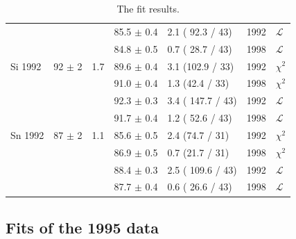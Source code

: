 \begin{table}[h]
\begin{center}
\begin{tabular}{|l||l|l|l|l|l|l|}
                 &                &     & 85.5 $\pm$ 0.4 & 2.1 ( 92.3 / 43) & 1992 & $\mathcal{L}$ \\
                 &                &     & 84.8 $\pm$ 0.5 & 0.7 ( 28.7 / 43) & 1998 & $\mathcal{L}$ \\
      \hline                                                                 
       Si 1992   & 92   $\pm$ 2   & 1.7 & 89.6 $\pm$ 0.4 &  3.1 (102.9 / 33)& 1992 & $\chi^2$ \\  
                 &                &     & 91.0 $\pm$ 0.4 &  1.3 (42.4 / 33) & 1998 & $\chi^2$ \\  
                                                                             
                 &                &     & 92.3 $\pm$ 0.3 & 3.4 ( 147.7 / 43)& 1992 & $\mathcal{L}$ \\
                 &                &     & 91.7 $\pm$ 0.4 & 1.2 ( 52.6 / 43) & 1998 & $\mathcal{L}$ \\
      \hline                                                                 
       Sn 1992   & 87   $\pm$ 2   & 1.1 & 85.6 $\pm$ 0.5 &  2.4 (74.7 / 31) & 1992 & $\chi^2$ \\  
                 &                &     & 86.9 $\pm$ 0.5 &  0.7 (21.7 / 31) & 1998 & $\chi^2$ \\  
                                                                             
                 &                &     & 88.4 $\pm$ 0.3 & 2.5 ( 109.6 / 43) & 1992 & $\mathcal{L}$ \\
                 &                &     & 87.7 $\pm$ 0.4 & 0.6 ( 26.6 / 43) & 1998 & $\mathcal{L}$ \\
      \hline                           
    \end{tabular}
  \end{center}
  \caption{The fit results.}
  \label{table:fits1992}
\end{table}

\subsection { Fits of the 1995 data }

